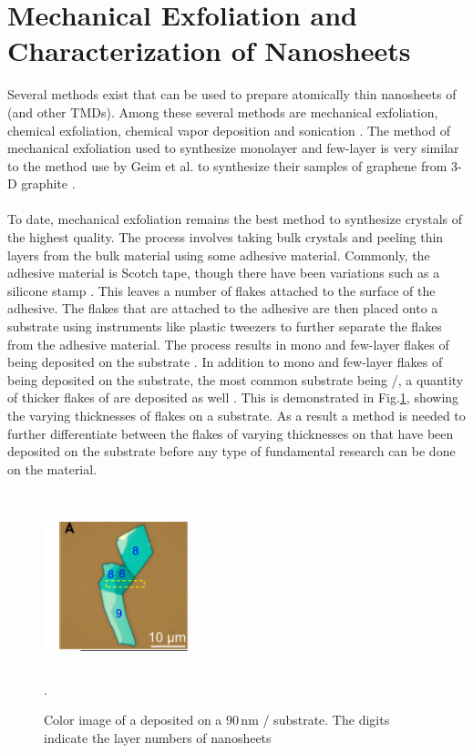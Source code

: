 \documentclass[%
 reprint,
 amsmath,amssymb,
 aps,
pra,
floatfix,
]{revtex4-1}
\begin{document}
\section{\label{sec:synthesis_methods} Mechanical Exfoliation and Characterization of  Nanosheets}
Several methods exist that can be used to prepare atomically thin nanosheets of  (and other TMDs). Among these several methods are mechanical exfoliation, chemical exfoliation, chemical vapor deposition and sonication \cite{grapheneLike2Dreview2013}. The method of mechanical exfoliation used to synthesize monolayer and few-layer  is very similar to the method use by Geim et al. to synthesize their samples of graphene from 3-D graphite \cite{novoselovEtAl2005}. 
\\ \\
To date, mechanical exfoliation remains the best method to synthesize  crystals of the highest quality. The process involves taking bulk  crystals and peeling thin layers from the bulk material using some adhesive material. Commonly, the adhesive material is Scotch tape, though there have been variations such as a silicone stamp \cite{Gomez2010}. This leaves a number of flakes attached to the surface of the adhesive. The flakes that are attached to the adhesive are then placed onto a substrate using instruments like plastic tweezers to further separate the flakes from the adhesive material. The process results in mono and few-layer flakes of  being deposited on the substrate \cite{Li2014}. In addition to mono and few-layer flakes of  being deposited on the substrate, the most common substrate being /, a quantity of thicker flakes of  are deposited as well \cite{acsnanoReview2013}. This is demonstrated in Fig.\ref{fig:exfoliation}, showing the varying thicknesses of  flakes on a substrate. As a result a method is needed to further differentiate between the flakes of varying thicknesses on that have been deposited on the substrate before any type of fundamental research can be done on the material. \\ \\
\begin{figure}
\includegraphics[height=4.5cm, width=4.5cm]{../figs/exfoliation}
\caption{Color image of a  deposited on a $90 \mathrm{\,nm}$ / substrate. The digits indicate the layer numbers of  nanosheets \cite{Li2014}}.
\label{fig:exfoliation}
\end{figure}
\end{document}
